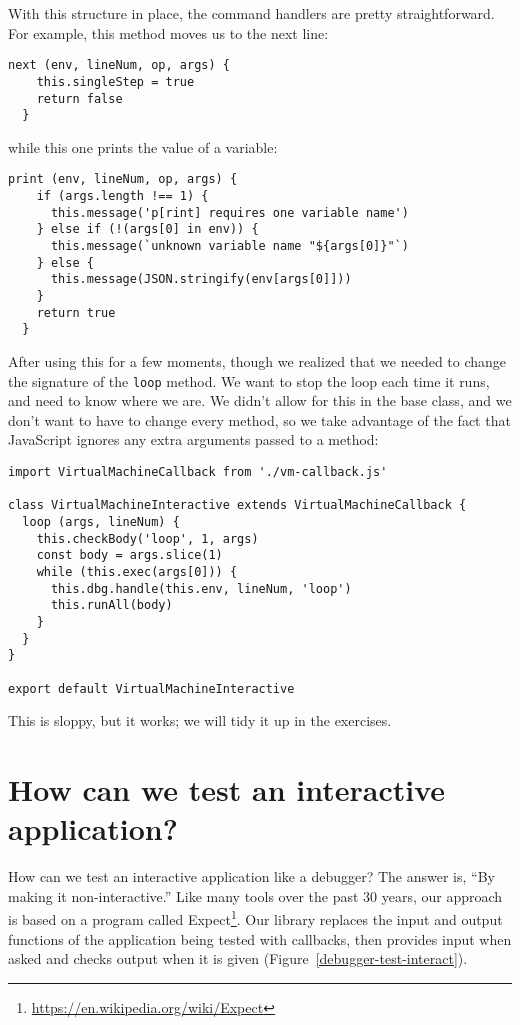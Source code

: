 \documentclass[krantzl]{krantz}
\newcommand{\figref}[1]{Figure~\ref{#1}}
\newcommand{\hreffoot}[2]{{#1}\footnote{\href{#2}{#2}}}
\begin{document}
With this structure in place,
the command handlers are pretty straightforward.
For example,
this method moves us to the next line:


\begin{lstlisting}[frame=tblr]
  next (env, lineNum, op, args) {
    this.singleStep = true
    return false
  }
\end{lstlisting}



\noindent while this one prints the value of a variable:


\begin{lstlisting}[frame=tblr]
  print (env, lineNum, op, args) {
    if (args.length !== 1) {
      this.message('p[rint] requires one variable name')
    } else if (!(args[0] in env)) {
      this.message(`unknown variable name "${args[0]}"`)
    } else {
      this.message(JSON.stringify(env[args[0]]))
    }
    return true
  }
\end{lstlisting}



After using this for a few moments,
though
we realized that we needed to change the signature of the \texttt{loop} method.
We want to stop the loop each time it runs,
and need to know where we are.
We didn’t allow for this in the base class,
and we don’t want to have to change every method,
so we take advantage of the fact that JavaScript ignores any extra arguments passed to a method:


\begin{lstlisting}[frame=tblr]
import VirtualMachineCallback from './vm-callback.js'

class VirtualMachineInteractive extends VirtualMachineCallback {
  loop (args, lineNum) {
    this.checkBody('loop', 1, args)
    const body = args.slice(1)
    while (this.exec(args[0])) {
      this.dbg.handle(this.env, lineNum, 'loop')
      this.runAll(body)
    }
  }
}

export default VirtualMachineInteractive
\end{lstlisting}



\noindent This is sloppy, but it works;
we will tidy it up in the exercises.

\section{How can we test an interactive application?}\label{debugger-test}


How can we test an interactive application like a debugger?
The answer is, “By making it non-interactive.”
Like many tools over the past 30 years,
our approach is based on a program called \hreffoot{Expect}{https://en.wikipedia.org/wiki/Expect}.
Our library replaces the input and output functions of the application being tested with callbacks,
then provides input when asked and checks output when it is given
(\figref{debugger-test-interact}).
\end{document}
